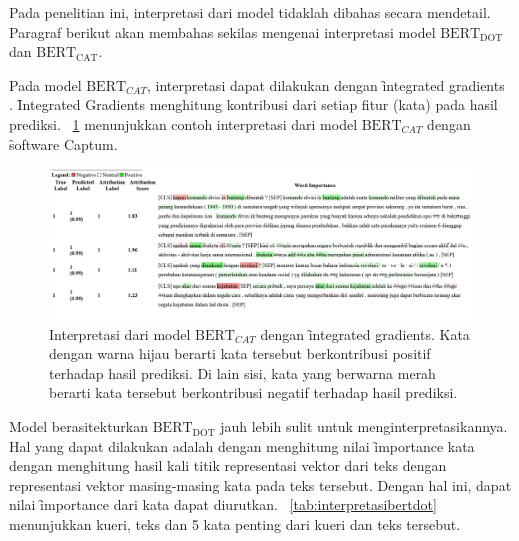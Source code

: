 Pada penelitian ini, interpretasi dari model tidaklah dibahas secara mendetail. Paragraf berikut akan membahas sekilas mengenai interpretasi model $\text{BERT}_{\text{DOT}}$ dan $\text{BERT}_{\text{CAT}}$.

Pada model $\text{BERT}_{CAT}$, interpretasi dapat dilakukan dengan \f{integrated gradients} \citep{integratedgradient}. \f{Integrated Gradients} menghitung kontribusi dari setiap fitur (kata) pada hasil prediksi. \pic~\ref{fig:InterpretasiBERTCAT} menunjukkan contoh interpretasi dari model $\text{BERT}_{CAT}$ dengan \f{software} Captum.

\begin{figure}[!ht]
    \centering
    \includegraphics[width=1\textwidth]{assets/pics/IGBERTCAT.png}
    \caption{Interpretasi dari model $\text{BERT}_{CAT}$ dengan \f{integrated gradients}. Kata dengan warna hijau berarti kata tersebut berkontribusi positif terhadap hasil prediksi. Di lain sisi, kata yang berwarna merah berarti kata tersebut berkontribusi negatif terhadap hasil prediksi.}
    \label{fig:InterpretasiBERTCAT}
\end{figure}

Model berasitekturkan $\text{BERT}_{\text{DOT}}$ jauh lebih sulit untuk menginterpretasikannya. Hal yang dapat dilakukan adalah dengan menghitung nilai \f{importance} kata dengan menghitung hasil kali titik representasi vektor dari teks dengan representasi vektor masing-masing kata pada teks tersebut. Dengan hal ini, dapat nilai \f{importance} dari kata dapat diurutkan. \tab~\ref{tab:interpretasibertdot} menunjukkan kueri, teks dan 5 kata penting dari kueri dan teks tersebut.

